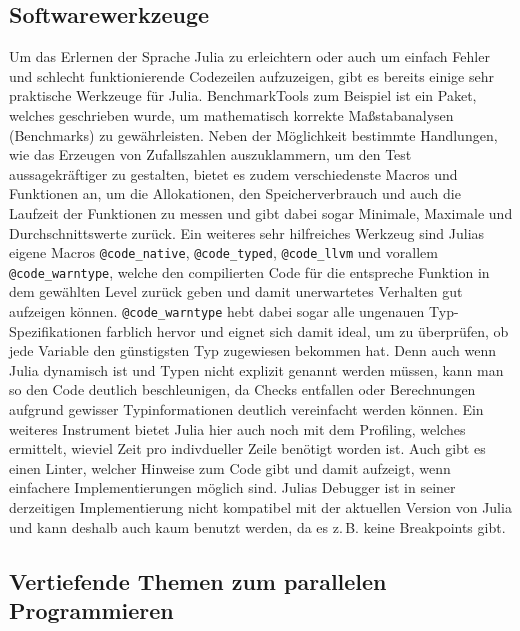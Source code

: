 \documentclass[proseminar,german,utf8]{zihpub}
\newcommand{\zB}[0]{{z.\,B. }}
\begin{document}
\subsection{Softwarewerkzeuge}

Um das Erlernen der Sprache Julia zu erleichtern oder auch um einfach Fehler und schlecht funktionierende Codezeilen aufzuzeigen, gibt es bereits einige sehr praktische Werkzeuge für Julia. BenchmarkTools zum Beispiel ist ein Paket, welches geschrieben wurde, um mathematisch korrekte Maßstabanalysen (Benchmarks) zu gewährleisten. Neben der Möglichkeit bestimmte Handlungen, wie das Erzeugen von Zufallszahlen auszuklammern, um den Test aussagekräftiger zu gestalten, bietet es zudem verschiedenste Macros und Funktionen an, um die Allokationen, den Speicherverbrauch und auch die Laufzeit der Funktionen zu messen und gibt dabei sogar Minimale, Maximale und Durchschnittswerte zurück. Ein weiteres sehr hilfreiches Werkzeug sind Julias eigene Macros \verb|@code_native|, \verb|@code_typed|, \verb|@code_llvm| und vorallem \verb|@code_warntype|, welche den compilierten Code für die entspreche Funktion in dem gewählten Level zurück geben und damit unerwartetes Verhalten gut aufzeigen können. \verb|@code_warntype| hebt dabei sogar alle ungenauen Typ-Spezifikationen farblich hervor und eignet sich damit ideal, um zu überprüfen, ob jede Variable den günstigsten Typ zugewiesen bekommen hat. Denn auch wenn Julia dynamisch ist und Typen nicht explizit genannt werden müssen, kann man so den Code deutlich beschleunigen, da Checks entfallen oder Berechnungen aufgrund gewisser Typinformationen deutlich vereinfacht werden können. Ein weiteres Instrument bietet Julia hier auch noch mit dem Profiling, welches ermittelt, wieviel Zeit pro indivdueller Zeile benötigt worden ist. Auch gibt es einen Linter, welcher Hinweise zum Code gibt und damit aufzeigt, wenn einfachere Implementierungen möglich sind. Julias Debugger ist in seiner derzeitigen Implementierung nicht kompatibel mit der aktuellen Version von Julia und kann deshalb auch kaum benutzt werden, da es \zB keine Breakpoints gibt.~\cite{JuliaLangDocumentation}

\subsection{Vertiefende Themen zum parallelen Programmieren}
\end{document}
